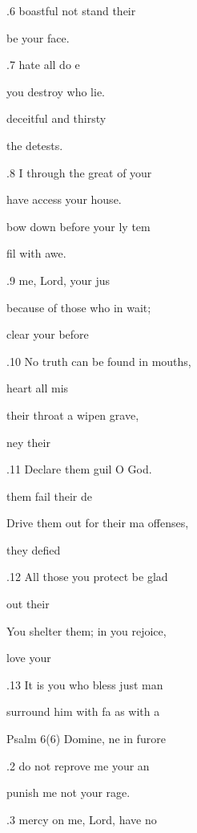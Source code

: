 .6  boastful  not stand their  

be your face. 

.7  hate all  do e 

you destroy  who lie. 

 deceitful and thirsty  

the  detests. 

.8  I through the great of your  

have access  your house. 

 bow down before your ly tem 

fil with awe. 

.9  me, Lord,  your jus 

because of those who  in wait; 

 clear your  before  

.10 No truth can be found in  mouths, 

 heart  all mis 

their throat a wipen grave, 

 ney their  

.11 Declare them guil O God. 

 them fail  their de 

Drive them out for their ma offenses, 

 they  defied  

.12 All those you protect  be glad 

  out their  

You shelter them; in you  rejoice, 

  love your  

.13 It is you who bless  just man 

 surround him with fa as with a  

Psalm 6(6) Domine, ne in furore 


.2  do not reprove me  your an 

punish me not  your rage. 

.3  mercy on me, Lord,  have no  

